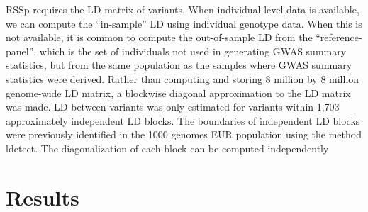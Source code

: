 RSSp requires the LD matrix of variants. When individual level data is available, we can compute the ``in-sample'' LD using individual genotype data. When this is not available, it is common to compute the out-of-sample LD from the ``reference-panel'', which is the set of individuals not used in generating GWAS summary statistics, but from the same population as the samples where GWAS summary statistics were derived. Rather than computing and storing 8 million by 8 million genome-wide LD matrix, a blockwise diagonal approximation to the LD matrix was made.  LD between variants was only estimated for variants within 1,703 approximately independent LD blocks.  The boundaries of independent LD blocks were previously identified in the 1000 genomes EUR population using the method ldetect\cite{ldetect}.  The diagonalization of each block can be computed independently

\section{Results}\label{sec:org26555b8}

